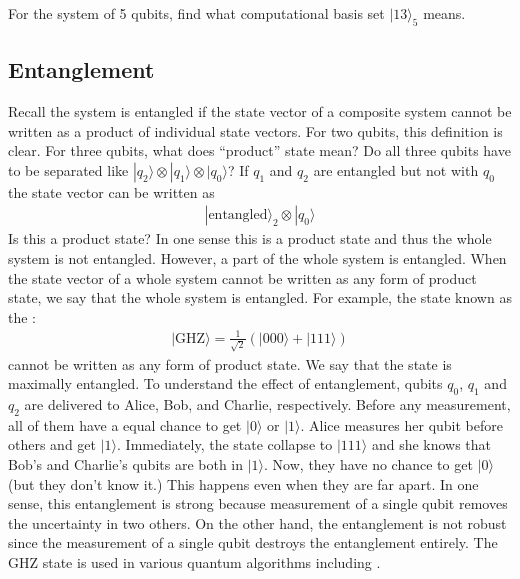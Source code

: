 \documentclass[letterpaper,10pt,english]{jupyterBook}
\begin{document}
\sphinxAtStartPar
{}  For the system of 5 qubits, find what computational basis set \(|13\rangle_5\) means.


\subsection{Entanglement}
\label{\detokenize{composites/morequbits:entanglement}}
\sphinxAtStartPar
Recall the system is entangled if the state vector of a composite system cannot be written as a product of individual state vectors.  For two qubits, this definition is clear.  For three qubits, what does “product” state mean?  Do all three qubits have to be separated like \(|q_2\rangle \otimes |q_1\rangle \otimes |q_0\rangle\)? If \(q_1\) and \(q_2\) are entangled but not with \(q_0\) the state vector can be written as
\begin{equation*}
\begin{split}
|\text{entangled}\rangle_2 \otimes |q_0\rangle
\end{split}
\end{equation*}
\sphinxAtStartPar
Is this a product state?  In one sense this is a product state and thus the whole system is not entangled.  However, a part of the whole system is entangled.   When the state vector of a whole system cannot be written as any form of product state, we say that the whole system is entangled.  For example, the state known as the :
\begin{equation*}
\begin{split}
|\text{GHZ}\rangle = \frac{1}{\sqrt{2}}\left(|000\rangle + |111\rangle\right)
\end{split}
\end{equation*}
\sphinxAtStartPar
cannot be written as any form of product state.  We say that the state is maximally entangled. To understand the effect of entanglement, qubits \(q_0\), \(q_1\) and \(q_2\) are delivered to Alice, Bob, and Charlie, respectively.  Before any measurement, all of them have a equal chance to get \(|0\rangle\) or \(|1\rangle\).  Alice measures her qubit before others and get \(|1\rangle\).  Immediately, the state collapse to \(|111\rangle\) and she knows that Bob’s and Charlie’s qubits are both in \(|1\rangle\).  Now, they have no chance to get \(|0\rangle\) (but they don’t know it.)  This happens even when they are far apart.  In one sense, this entanglement is strong because measurement of a single qubit removes the uncertainty in two others.  On the other hand, the entanglement is not robust since the measurement of a single qubit destroys the entanglement entirely. The GHZ state is used in various quantum algorithms including .
\end{document}
